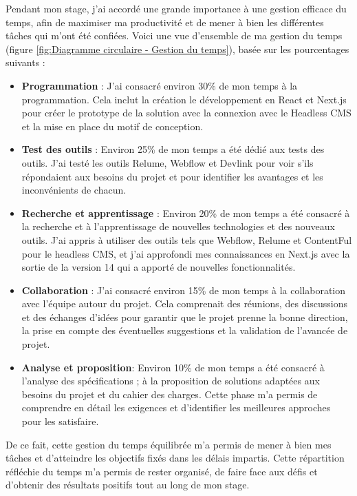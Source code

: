 Pendant mon stage, j'ai accordé une grande importance à une gestion efficace du temps, afin de maximiser ma productivité et de mener à bien les différentes tâches qui m'ont été confiées. Voici une vue d'ensemble de ma gestion du temps (figure \ref{fig:Diagramme circulaire - Gestion du temps}), basée sur les pourcentages suivants :

\begin{itemize}
\item \textbf{Programmation} : J'ai consacré environ 30\% de mon temps à la programmation. Cela inclut la création le développement en React et Next.js pour créer le prototype de la solution avec la connexion avec le Headless CMS et la mise en place du motif de conception.

\item \textbf{Test des outils} : Environ 25\% de mon temps a été dédié aux tests des outils. J'ai testé les outils Relume, Webflow et Devlink pour voir s'ils répondaient aux besoins du projet et pour identifier les avantages et les inconvénients de chacun.

\item \textbf{Recherche et apprentissage} : Environ 20\% de mon temps a été consacré à la recherche et à l'apprentissage de nouvelles technologies et des nouveaux outils. J'ai appris à utiliser des outils tels que Webflow, Relume et ContentFul pour le headless CMS, et j'ai approfondi mes connaissances en Next.js avec la sortie de la version 14 qui a apporté de nouvelles fonctionnalités.

\item \textbf{Collaboration} : J'ai consacré environ 15\% de mon temps à la collaboration avec l'équipe autour du projet. Cela comprenait des réunions, des discussions et des échanges d'idées pour garantir que le projet prenne la bonne direction, la prise en compte des éventuelles suggestions et la validation de l'avancée de projet.

\item \textbf{Analyse et proposition}: Environ 10\% de mon temps a été consacré à l'analyse des spécifications ; à la proposition de solutions adaptées aux besoins du projet et du cahier des charges. Cette phase m'a permis de comprendre en détail les exigences et d'identifier les meilleures approches pour les satisfaire.
\end{itemize}

De ce fait, cette gestion du temps équilibrée m'a permis de mener à bien mes tâches et d'atteindre les objectifs fixés dans les délais impartis. Cette répartition réfléchie du temps m'a permis de rester organisé, de faire face aux défis et d'obtenir des résultats positifs tout au long de mon stage.
